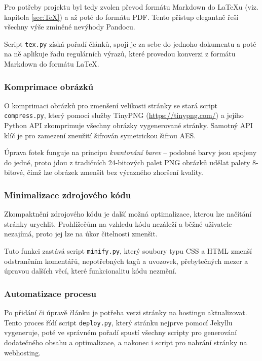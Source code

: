 \documentclass[a4paper, 12pt]{article}
\begin{document}
  Pro potřeby projektu byl tedy zvolen převod formátu Markdown do \LaTeX u (viz. kapitola \ref{sec:TeX}) a až poté do formátu PDF. Tento přístup elegantně řeší všechny výše zmíněné nevýhody Pandocu.

  Script \texttt{tex.py} získá pořadí článků, spojí je za sebe do jednoho dokumentu a poté na ně aplikuje řadu regulárních výrazů, které provedou konverzi z formátu Markdown do formátu \LaTeX.



  \subsubsection{Komprimace obrázků}
  O komprimaci obrázků pro zmenšení velikosti stránky se stará script \texttt{compress.py}, který pomocí služby TinyPNG (\url{https://tinypng.com/}) a jejího Python API zkomprimuje všechny obrázky vygenerované stránky. Samotný API klíč je pro zamezení zneužití šifrován symetrickou šifrou AES.

  Úprava fotek funguje na principu \emph{kvantování barev} -- podobné barvy jsou spojeny do jedné, proto jdou z tradičních 24-bitových palet PNG obrázků udělat palety 8-bitové, čímž lze obrázek zmenšit bez výrazného zhoršení kvality.


  \subsubsection{Minimalizace zdrojového kódu}
  Zkompaktnění zdrojového kódu je další možná optimalizace, kterou lze načítání stránky urychlit. Prohlížečům na vzhledu kódu nezáleží a běžné uživatele nezajímá, proto jej lze na úkor čitelnosti zmenšit.

  Tuto funkci zastává script \texttt{minify.py}, který soubory typu CSS a HTML zmenší odstraněním komentářů, nepotřebných tagů a uvozovek, přebytečných mezer a úpravou dalších věcí, které funkcionalitu kódu nezmění.


  \subsubsection{Automatizace procesu}
  Po přidání či úpravě článku je potřeba verzi stránky na hostingu aktualizovat. Tento proces řídí script \texttt{deploy.py}, který stránku nejprve pomocí Jekyllu vygeneruje, poté ve správném pořadí spustí všechny scripty pro generování dodatečného obsahu a optimalizace, a nakonec i script pro nahrání stránky na webhosting.
\end{document}
